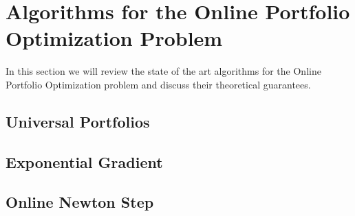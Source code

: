 \chapter{Algorithms for the Online Portfolio Optimization Problem}

In this section we will review the state of the art algorithms for the Online Portfolio Optimization problem and discuss their theoretical guarantees.

\section{Universal Portfolios}

\section{Exponential Gradient}

\section{Online Newton Step}
